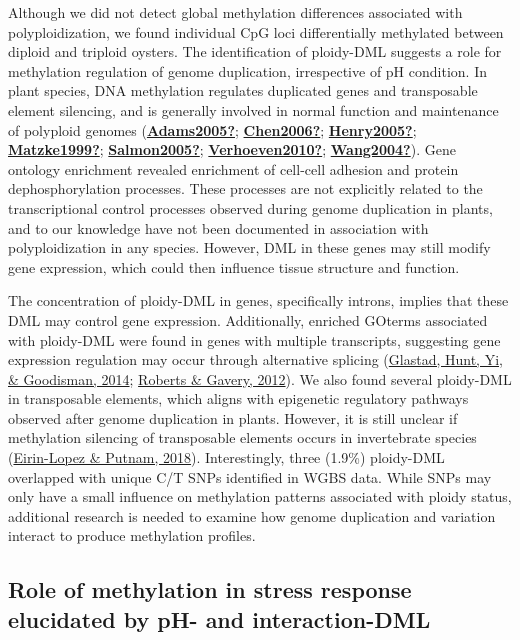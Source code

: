 \documentclass [11pt, proquest] {uwthesis}[2015/03/03]
\begin{document}
Although we did not detect global methylation differences associated with polyploidization, we found individual CpG loci differentially methylated between diploid and triploid oysters. The identification of ploidy-DML suggests a role for methylation regulation of genome duplication, irrespective of pH condition. In plant species, DNA methylation regulates duplicated genes and transposable element silencing, and is generally involved in normal function and maintenance of polyploid genomes (\protect\hyperlink{ref-Adams2005}{\textbf{Adams2005?}}; \protect\hyperlink{ref-Chen2006}{\textbf{Chen2006?}}; \protect\hyperlink{ref-Henry2005}{\textbf{Henry2005?}}; \protect\hyperlink{ref-Matzke1999}{\textbf{Matzke1999?}}; \protect\hyperlink{ref-Salmon2005}{\textbf{Salmon2005?}}; \protect\hyperlink{ref-Verhoeven2010}{\textbf{Verhoeven2010?}}; \protect\hyperlink{ref-Wang2004}{\textbf{Wang2004?}}). Gene ontology enrichment revealed enrichment of cell-cell adhesion and protein dephosphorylation processes. These processes are not explicitly related to the transcriptional control processes observed during genome duplication in plants, and to our knowledge have not been documented in association with polyploidization in any species. However, DML in these genes may still modify gene expression, which could then influence tissue structure and function.

The concentration of ploidy-DML in genes, specifically introns, implies that these DML may control gene expression. Additionally, enriched GOterms associated with ploidy-DML were found in genes with multiple transcripts, suggesting gene expression regulation may occur through alternative splicing (\protect\hyperlink{ref-Glastad2014}{Glastad, Hunt, Yi, \& Goodisman, 2014}; \protect\hyperlink{ref-Roberts2012}{Roberts \& Gavery, 2012}). We also found several ploidy-DML in transposable elements, which aligns with epigenetic regulatory pathways observed after genome duplication in plants. However, it is still unclear if methylation silencing of transposable elements occurs in invertebrate species (\protect\hyperlink{ref-Eirin-Lopez2018}{Eirin-Lopez \& Putnam, 2018}). Interestingly, three (1.9\%) ploidy-DML overlapped with unique C/T SNPs identified in WGBS data. While SNPs may only have a small influence on methylation patterns associated with ploidy status, additional research is needed to examine how genome duplication and variation interact to produce methylation profiles.

\hypertarget{role-of-methylation-in-stress-response-elucidated-by-ph--and-interaction-dml}{%
\subsection{Role of methylation in stress response elucidated by pH- and interaction-DML}\label{role-of-methylation-in-stress-response-elucidated-by-ph--and-interaction-dml}}
\end{document}

